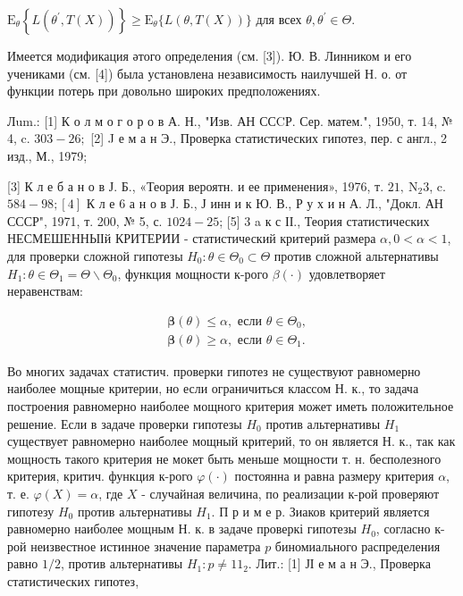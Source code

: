 \documentclass[10pt]{article}
\begin{document}
$\mathrm{E}_{\theta}\left\{L\left(\theta^{\prime}, T(X)\right)\right\} \geqslant \mathrm{E}_{\theta}\{L(\theta, T(X))\}$ для всех $\theta, \theta^{\prime} \in \Theta$.



Имеется модификация әтого определения (см. [3]). Ю. В. Линником и его учениками (см. [4]) была установлена независимость наилучшей $Н$. о. от функции потерь при довольно широких предположениях.



Лum.: [1] К о л м о г о р о в А. Н., "Изв. АН ССCР. Сер. матем.", 1950, т. 14, № 4, c. $303-26 ;$ [2] J е м а н Э., Проверка статистических гипотез, пер. с англ., 2 изд., М., 1979;

[3] К л е б а н о в Ј. Б., «Теория вероятн. и ее применения», 1976, т. $21, \mathrm{~N}_{2} 3$, c. $584-98 ;[4]$ К л е 6 а н о в Ј. Б., Ј инн и к Ю. В., Р у х и н А. Л., "Докл. АН СССР", 1971, т. 200, № 5, с. $1024-25$; [5] 3 a к с ІІ., Теория статистических НЕСМЕШЕННЫІй КРИТЕРИИ - статистический критерий размера $\alpha, 0<\alpha<1$, для проверки сложной гипотезы $H_{0}: \theta \in \Theta_{0} \subset \Theta$ против сложной альтернативы $H_{1}: \theta \in \Theta_{1}=\Theta \backslash \Theta_{0}$, функция мощности к-рого $\beta(\cdot)$ удовлетворяет неравенствам:



\[

\begin{aligned}

& \boldsymbol{\beta}(\theta) \leqslant \alpha, \text { если } \theta \in \Theta_{0}, \\

& \boldsymbol{\beta}(\theta) \geqslant \alpha, \text { если } \theta \in \Theta_{1} .

\end{aligned}

\]



Во многих задачах статистич. проверки гипотез не существуют равномерно наиболее мощные критерии, но если ограничиться классом Н. к., то задача построения равномерно наиболее мощного критерия может иметь положительное решение. Если в задаче проверки гипотезы $H_{0}$ против альтернативы $H_{1}$ существует равномерно наиболее мощный критерий, то он является Н. к., так как мощность такого критерия не мокет быть меньше мощности т. н. бесполезного критерия, критич. функция к-рого $\varphi(\cdot)$ постоянна и равна размеру критерия $\alpha$, т. е. $\varphi(X)=\alpha$, где $X$ - случайная величина, по реализации к-рой проверяют гипотезу $H_{0}$ против альтернативы $H_{1}$. П р и м е р. Зиаков критерий является равномерно наиболее мощным Н. к. в задаче проверкі гипотезы $H_{0}$, согласно к-рой неизвестное истинное значение параметра $p$ биномиального распределения равно $1 / 2$, против альтернативы $H_{1}: p \neq 11_{2}$. Лит.: [1] ЈІ е м а н Э., Проверка статистических гипотез,
\end{document}

